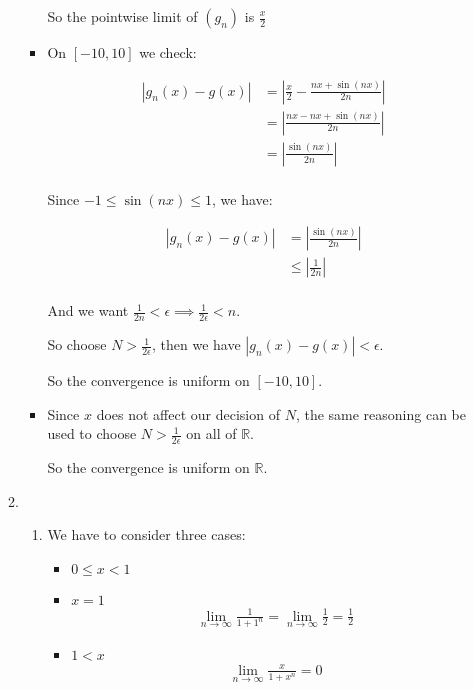 \documentclass[12pt,letterpaper]{article}
\begin{document}
\begin{enumerate}
\begin{enumerate}
\begin{itemize}
              So the pointwise limit of $(g_n)$ is $\frac{x}{2}$

            \item
              On $[-10, 10]$ we check:

              \begin{align*}
                \left|g_n(x) - g(x)\right|
                &= \left|\frac{x}{2} - \frac{nx + \sin(nx)}{2n} \right| \\
                &= \left|\frac{nx - nx + \sin(nx)}{2n} \right| \\
                &= \left|\frac{\sin(nx)}{2n} \right| \\
              \end{align*}

              Since $-1 \leq \sin(nx) \leq 1$, we have:

              \begin{align*}
                \left|g_n(x) - g(x)\right|
                &= \left|\frac{\sin(nx)}{2n} \right| \\
                &\leq \left| \frac{1}{2n} \right| \\
              \end{align*}

              And we want $\frac{1}{2n} < \epsilon \implies \frac{1}{2\epsilon} < n$.

              So choose $N > \frac{1}{2\epsilon}$, then we have $\left|g_n(x) - g(x)\right| < \epsilon$.

              So the convergence is uniform on $[-10, 10]$.
            \item

              Since $x$ does not affect our decision of $N$,
              the same reasoning can be used to choose $N > \frac{1}{2\epsilon}$ on all of $\mathbb{R}$.

              So the convergence is uniform on $\mathbb{R}$.
          \end{itemize}
        \item
          \begin{enumerate}
            \item
              We have to consider three cases:
              \begin{itemize}
                \item $0 \leq x < 1$
                \item $x = 1$
                  \begin{align*}
                    \lim_{n \to \infty} \frac{1}{1 + 1^n} = \lim_{n \to \infty} \frac{1}{2} = \frac{1}{2}
                  \end{align*}
                \item $1 < x$
                  \begin{align*}
                    \lim_{n \to \infty} \frac{x}{1 + x^n} = 0
                  \end{align*}
              \end{itemize}


\end{enumerate}
\end{enumerate}
\end{enumerate}
\end{document}
